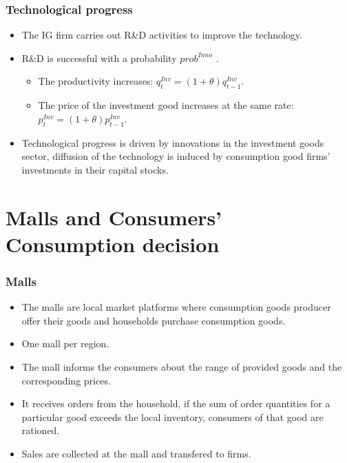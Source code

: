 \documentclass{beamer}
\begin{document}
\frame
{

  \frametitle{Technological progress} 
\begin{itemize}

\item The IG firm carries out R\&D activities to improve the technology.

\item R\&D is successful with a probability $prob^{Inno}$ .
\begin{itemize}
	
	\item The productivity increases: $q_t^{Inv}=(1+\theta)q_{t-1}^{Inv}$.
	
	\item The price of the investment good increases at the same rate: $p_t^{Inv}=(1+\theta)p_{t-1}^{Inv}$.

\end{itemize}

\item Technological progress is driven by innovations in the investment goods sector, diffusion of the technology is induced by consumption good firms' investments in their capital stocks.
  

\end{itemize}
  
}

\section{Malls and Consumers' Consumption decision}

\frame
{

  \frametitle{Malls} 
\begin{itemize}

\item The malls are local market platforms where consumption goods producer offer their goods and households purchase consumption goods.
\item One mall per region.
\item The mall informs the consumers about the range of provided goods and the corresponding prices.
\item It receives  orders from the household, if the sum of order quantities for a particular good exceeds the local inventory, consumers of that good are rationed.
\item Sales are collected at the mall and transfered to firms. 
  

\end{itemize}



  
}
\end{document}
